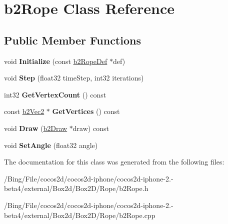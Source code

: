 \hypertarget{classb2_rope}{\section{b2\-Rope Class Reference}
\label{classb2_rope}
}
\subsection*{Public Member Functions}
\begin{DoxyCompactItemize}
\item 
\hypertarget{classb2_rope_a2a672ca3310790f4af1beb123e597d70}{void {\bfseries Initialize} (const \hyperlink{structb2_rope_def}{b2\-Rope\-Def} $\ast$def)}\label{classb2_rope_a2a672ca3310790f4af1beb123e597d70}

\item 
\hypertarget{classb2_rope_abe9ce398cef717b136645cbc37f38d70}{void {\bfseries Step} (float32 time\-Step, int32 iterations)}\label{classb2_rope_abe9ce398cef717b136645cbc37f38d70}

\item 
\hypertarget{classb2_rope_aa002b5f7efd152770803aade884f2c75}{int32 {\bfseries Get\-Vertex\-Count} () const }\label{classb2_rope_aa002b5f7efd152770803aade884f2c75}

\item 
\hypertarget{classb2_rope_a9f5c76a25e44baa702d2a6beef9f2f9c}{const \hyperlink{structb2_vec2}{b2\-Vec2} $\ast$ {\bfseries Get\-Vertices} () const }\label{classb2_rope_a9f5c76a25e44baa702d2a6beef9f2f9c}

\item 
\hypertarget{classb2_rope_acefc7b4d53ba675fc08700f39d121ec3}{void {\bfseries Draw} (\hyperlink{classb2_draw}{b2\-Draw} $\ast$draw) const }\label{classb2_rope_acefc7b4d53ba675fc08700f39d121ec3}

\item 
\hypertarget{classb2_rope_a8a1717a5e0b2c54d56fe438c8cae43b7}{void {\bfseries Set\-Angle} (float32 angle)}\label{classb2_rope_a8a1717a5e0b2c54d56fe438c8cae43b7}

\end{DoxyCompactItemize}


The documentation for this class was generated from the following files\-:\begin{DoxyCompactItemize}
\item 
/\-Bing/\-File/cocos2d/cocos2d-\/iphone/cocos2d-\/iphone-\/2.-\/beta4/external/\-Box2d/\-Box2\-D/\-Rope/b2\-Rope.\-h\item 
/\-Bing/\-File/cocos2d/cocos2d-\/iphone/cocos2d-\/iphone-\/2.-\/beta4/external/\-Box2d/\-Box2\-D/\-Rope/b2\-Rope.\-cpp\end{DoxyCompactItemize}
